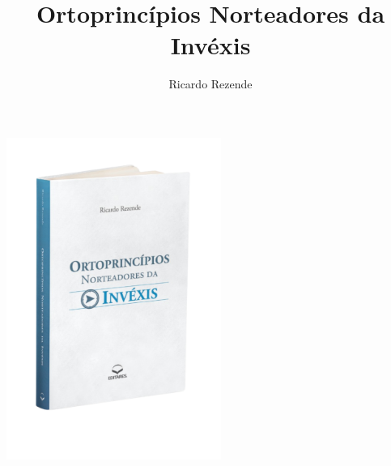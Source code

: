 \documentclass{gescons}
\author{Ricardo Rezende}
\title{Ortoprincípios Norteadores da Invéxis}
\begin{document}
    \makeentrevistatitle

\begin{center}
    \includegraphics[width=7cm]{articles/entrevista/mockups/Ricardo-Rezende-Invexis.png}
\end{center}
\end{document}
